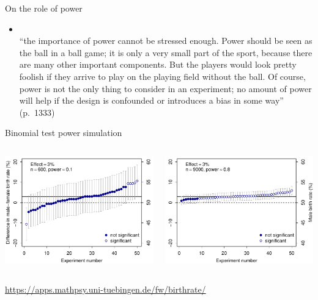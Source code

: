 \documentclass[aspectratio=169]{beamer}
\begin{document}
\begin{frame}{On the role of power}

\begin{itemize}
\item \citet{VasishthGelman21}\\[1ex]

``the importance of power cannot be stressed enough. Power should be seen as
the ball in a ball game; it is only a very small part of the sport, because
there are many other important components. But the players would look pretty
foolish if they arrive to play on the playing field without the ball. Of
course, power is not the only thing to consider in an experiment; no amount of
power will help if the design is confounded or introduces a bias in some
way'' (p.~1333)
\end{itemize}

\end{frame}

\begin{frame}{Binomial test power simulation}

\begin{columns}
\begin{column}{7.9cm}
\includegraphics[width=7.9cm]{fig/birthdiff10}
\end{column}
%
\begin{column}{7.9cm}
\includegraphics[width=7.9cm]{fig/birthdiff80}
\end{column}
\end{columns}

\vspace{2ex}

  \url{https://apps.mathpsy.uni-tuebingen.de/fw/birthrate/}

\end{frame}
\end{document}
